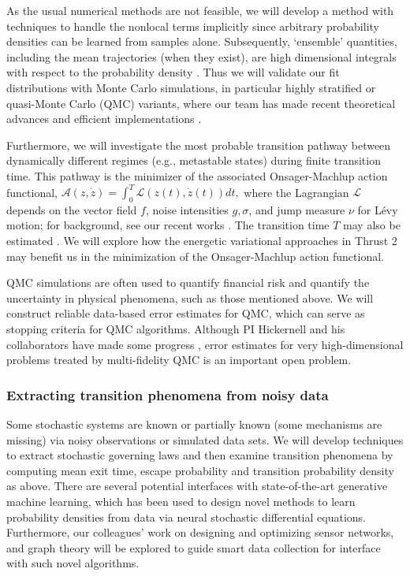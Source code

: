 \documentclass[11pt]{NSFamsart}
\begin{document}
As the usual numerical methods  are not feasible, we will develop a method with techniques to handle the nonlocal terms implicitly since arbitrary probability densities can be learned from samples alone. Subsequently, `ensemble' quantities, including the mean trajectories (when they exist), are high dimensional integrals with respect to the probability density \cite{DuanBook2015}.  Thus we will validate our fit distributions with Monte Carlo simulations, in particular highly stratified or quasi-Monte Carlo (QMC) variants, where our team has made recent theoretical advances \cite{Hic17a, HicEtal17a} and efficient implementations \cite{QMCPy2020a,ChoEtal22a}.

Furthermore, we will investigate the most probable transition pathway between dynamically different regimes (e.g., metastable states) during finite transition time. This pathway is the minimizer of the associated Onsager-Machlup action functional, $\mathcal{A}(z, \dot z) = \int_0^T \mathcal{L}(z(t), \dot z(t)) dt,$ where the Lagrangian  $\mathcal{L}$ depends on the vector field $f$, noise intensities $g, \sigma$, and  jump measure $\nu$ for L\'evy motion; for background, see   our recent works \cite{ChaoDuanOM,HuangYF}. The   transition time $T$ may also be estimated \cite{HuangYF2020}. We will explore how the energetic variational approaches in Thrust 2 may benefit us in the minimization of the Onsager-Machlup action functional. 

QMC simulations are often used to quantify financial risk and quantify the uncertainty in physical phenomena, such as those mentioned above.  We will construct reliable data-based error estimates for QMC, which can serve as stopping criteria for QMC algorithms.  Although PI Hickernell and his collaborators have made some progress \cite{HicJim16a,JimHic16a,HicEtal17a,RatHic19a,JagHic22a}, error estimates for very high-dimensional problems treated by multi-fidelity QMC is an important open problem.

\subsubsection*{Extracting transition phenomena from noisy data}
Some   stochastic systems are known or partially known (some mechanisms are missing) via noisy observations or simulated data sets. We will  develop techniques to extract stochastic governing laws \cite{Wei2022AnOC, YangLi2020a, Li2022ExtractingGL, Lu2022LearningTT} and then examine transition phenomena by computing mean exit time, escape probability and transition probability density as above. 
There are several potential interfaces with state-of-the-art generative machine learning, which has been used to design novel methods to learn probability densities from data via neural stochastic differential equations. Furthermore, our colleagues'  work on 
designing and optimizing sensor networks, and graph theory \cite{karwa2016statistical,Calines2008MonitoringSF} will be explored to guide smart data collection for interface with such novel algorithms. 
\end{document}
